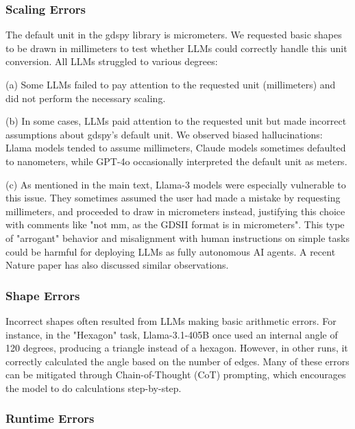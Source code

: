 \documentclass{article}
\begin{document}
\subsubsection{Scaling Errors}
\label{appendix:scaling_errors}

The default unit in the gdspy library is micrometers. We requested basic shapes to be drawn in millimeters to test whether LLMs could correctly handle this unit conversion. All LLMs struggled to various degrees:

(a) Some LLMs failed to pay attention to the requested unit (millimeters) and did not perform the necessary scaling.

(b) In some cases, LLMs paid attention to the requested unit but made incorrect assumptions about gdspy's default unit. We observed biased hallucinations: Llama models tended to assume millimeters, Claude models sometimes defaulted to nanometers, while GPT-4o occasionally interpreted the default unit as meters.

(c) As mentioned in the main text, Llama-3 models were especially vulnerable to this issue. They sometimes assumed the user had made a mistake by requesting millimeters, and proceeded to draw in micrometers instead, justifying this choice with comments like "not mm, as the GDSII format is in micrometers". This type of "arrogant" behavior and misalignment with human instructions on simple tasks could be harmful for deploying LLMs as fully autonomous AI agents. A recent Nature paper \cite{ZhouNature2024} has also discussed similar observations.

\subsubsection{Shape Errors}
\label{appendix:shape_errors}

Incorrect shapes often resulted from LLMs making basic arithmetic errors. For instance, in the "Hexagon" task, Llama-3.1-405B once used an internal angle of 120 degrees, producing a triangle instead of a hexagon. However, in other runs, it correctly calculated the angle based on the number of edges. Many of these errors can be mitigated through Chain-of-Thought (CoT) prompting, which encourages the model to do calculations step-by-step.

\subsubsection{Runtime Errors}
\label{appendix:runtime_errors}
\end{document}
